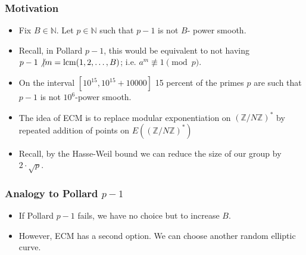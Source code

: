 \documentclass{beamer}
\begin{document}
\begin{frame}
\frametitle{Motivation}

\begin{itemize}
\item<2-> Fix $B \in \mathbb{N}$. Let $p \in \mathbb{N}$ such that $p-1$ is not $B$- power smooth.

\item<3-> Recall, in Pollard $p-1$, this would be equivalent to not having $p-1 \not \vert m = \text{lcm}(1,2, \ldots, B)$; i.e. $a^m \not \equiv 1 \pmod{p}$.

\item<4-> On the interval $[10^{15}, 10^{15} + 10000]$ 15 percent of the primes $p$ are such that $p-1$ is not $10^{6}$-power smooth.

\item<5-> The idea of ECM is to replace modular exponentiation on $\left(\mathbb{Z}/N\mathbb{Z}\right)^*$ by repeated addition of points on $E\left(\left(\mathbb{Z}/N\mathbb{Z}\right)^*\right)$

\item<6-> Recall, by the Hasse-Weil bound we can reduce the size of our group by $2\cdot \sqrt{p}$.
\end{itemize}
\end{frame}

\begin{frame}
\frametitle{Analogy to Pollard $p-1$}
\begin{table}[h!]
  \begin{center}
    \label{tab:table1}
  \end{center}
\end{table}

\begin{itemize}
\item<7-> If Pollard $p-1$ fails, we have no choice but to increase $B$.
\item<8-> However, ECM has a second option. We can choose another random elliptic curve.
\end{itemize}
\end{frame}
\end{document}
